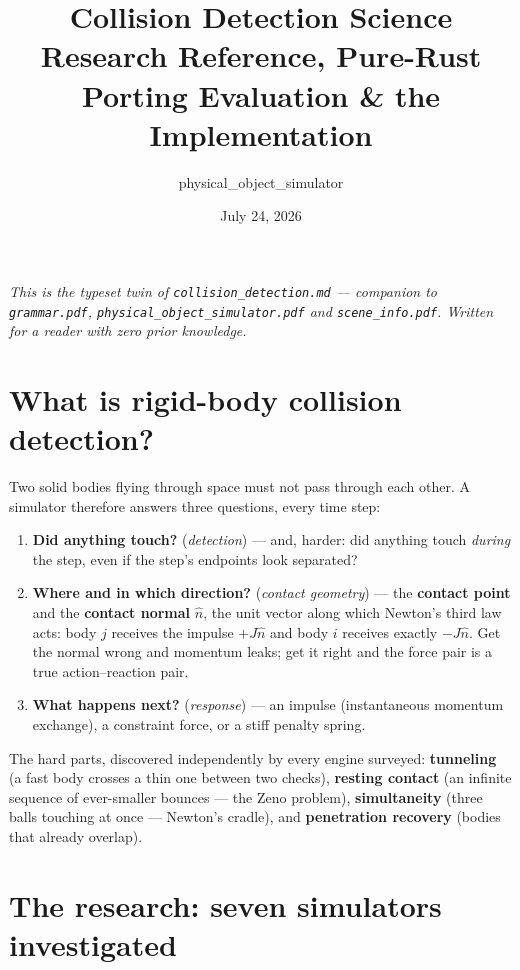 \documentclass[11pt]{article}
\title{Collision Detection Science\\[2pt]
       \large Research Reference, Pure-Rust Porting Evaluation \& the
       \code{posim} Implementation}
\author{physical\_object\_simulator}
\date{July 24, 2026}
\newcommand{\code}[1]{\texttt{#1}}
\begin{document}
\maketitle

\noindent\emph{This is the typeset twin of \code{collision\_detection.md} ---
companion to \code{grammar.pdf}, \code{physical\_object\_simulator.pdf} and
\code{scene\_info.pdf}. Written for a reader with zero prior knowledge.}

\tableofcontents

\section{What is rigid-body collision detection?}

Two solid bodies flying through space must not pass through each other. A
simulator therefore answers three questions, every time step:

\begin{enumerate}
\item \textbf{Did anything touch?} (\emph{detection}) --- and, harder: did
      anything touch \emph{during} the step, even if the step's endpoints look
      separated?
\item \textbf{Where and in which direction?} (\emph{contact geometry}) --- the
      \textbf{contact point} and the \textbf{contact normal} $\hat n$, the unit
      vector along which Newton's third law acts: body $j$ receives the impulse
      $+J\hat n$ and body $i$ receives exactly $-J\hat n$. Get the normal wrong
      and momentum leaks; get it right and the force pair is a true
      action--reaction pair.
\item \textbf{What happens next?} (\emph{response}) --- an impulse
      (instantaneous momentum exchange), a constraint force, or a stiff penalty
      spring.
\end{enumerate}

The hard parts, discovered independently by every engine surveyed:
\textbf{tunneling} (a fast body crosses a thin one between two checks),
\textbf{resting contact} (an infinite sequence of ever-smaller bounces --- the
Zeno problem), \textbf{simultaneity} (three balls touching at once --- Newton's
cradle), and \textbf{penetration recovery} (bodies that already overlap).

\section{The research: seven simulators investigated}
\end{document}
